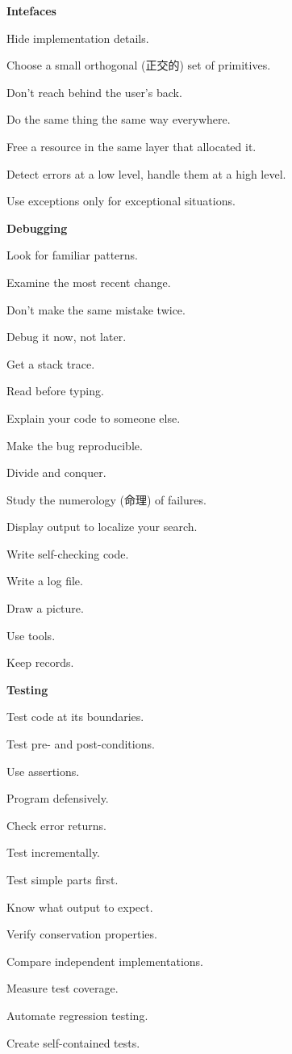 {\Large\textbf{Intefaces}}
\begin{myitemize}
\item Hide implementation details.
\item Choose a small orthogonal (正交的) set of primitives.
\item Don't reach behind the user's back.
\item Do the same thing the same way everywhere.
\item Free a resource in the same layer that allocated it.
\item Detect errors at a low level, handle them at a high level.
\item Use exceptions only for exceptional situations.
\end{myitemize}

{\Large\textbf{Debugging}}
\begin{myitemize}
\item Look for familiar patterns.
\item Examine the most recent change.
\item Don't make the same mistake twice.
\item Debug it now, not later.
\item Get a stack trace.
\item Read before typing.
\item Explain your code to someone else.
\item Make the bug reproducible.
\item Divide and conquer.
\item Study the numerology (命理) of failures.
\item Display output to localize your search.
\item Write self-checking code.
\item Write a log file.
\item Draw a picture.
\item Use tools.
\item Keep records.
\end{myitemize}

{\Large\textbf{Testing}}
\begin{myitemize}
\item Test code at its boundaries.
\item Test pre- and post-conditions.
\item Use assertions.
\item Program defensively.
\item Check error returns.
\item Test incrementally.
\item Test simple parts first.
\item Know what output to expect.
\item Verify conservation properties.
\item Compare independent implementations.
\item Measure test coverage.
\item Automate regression testing.
\item Create self-contained tests.
\end{myitemize}

